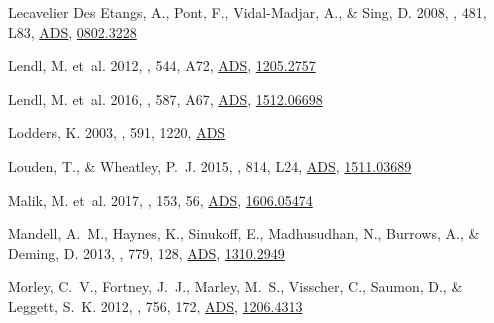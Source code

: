\documentclass[tighten, times, twocolumn]{aastex61}  %
\newcommand{\eprint}[1]{\href{http://arxiv.org/abs/#1}{#1}}
\renewcommand{\eprint}[1]{\href{http://arxiv.org/abs/#1}{#1}}
\providecommand{\adsurl}[1]{\href{#1}{ADS}}
\renewcommand\c{\setbox\wdbox=\hbox{,}\hspace{\wd\wdbox}}
\begin{document}
\begin{thebibliography}{50}
{Lecavelier Des Etangs}, A., {Pont}, F., {Vidal-Madjar}, A., \& {Sing}, D.
  2008, \aap, 481, L83,
  \adsurl{http://adsabs.harvard.edu/abs/2008A\%26A...481L..83L},
  \eprint{0802.3228}

{Lendl}, M. {et~al.} 2012, \aap, 544, A72,
  \adsurl{http://adsabs.harvard.edu/abs/2012A\%26A...544A..72L},
  \eprint{1205.2757}

{Lendl}, M. {et~al.} 2016, \aap, 587, A67,
  \adsurl{http://adsabs.harvard.edu/abs/2016A\%26A...587A..67L},
  \eprint{1512.06698}

{Lodders}, K. 2003, \apj, 591, 1220,
  \adsurl{http://adsabs.harvard.edu/abs/2003ApJ...591.1220L}

{Louden}, T., \& {Wheatley}, P.~J. 2015, \apjl, 814, L24,
  \adsurl{http://adsabs.harvard.edu/abs/2015ApJ...814L..24L},
  \eprint{1511.03689}

\bibitem[{{Malik} {et~al.}(2017){Malik}, {Grosheintz}, {Mendon{\c c}a},
  {Grimm}, {Lavie}, {Kitzmann}, {Tsai}, {Burrows}, {Kreidberg}, {Bedell},
  {Bean}, {Stevenson}, \& {Heng}}]{MalikEtal2017apjHelios}
{Malik}, M. {et~al.} 2017, \aj, 153, 56,
  \adsurl{http://adsabs.harvard.edu/abs/2017AJ....153...56M},
  \eprint{1606.05474}

{Mandell}, A.~M., {Haynes}, K., {Sinukoff}, E., {Madhusudhan}, N., {Burrows},
  A., \& {Deming}, D. 2013, \apj, 779, 128,
  \adsurl{http://adsabs.harvard.edu/abs/2013ApJ...779..128M},
  \eprint{1310.2949}

{Morley}, C.~V., {Fortney}, J.~J., {Marley}, M.~S., {Visscher}, C., {Saumon},
  D., \& {Leggett}, S.~K. 2012, \apj, 756, 172,
  \adsurl{http://adsabs.harvard.edu/abs/2012ApJ...756..172M},
  \eprint{1206.4313}


\end{thebibliography}
\end{document}
